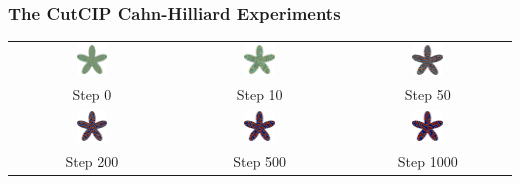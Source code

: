 \begin{frame}
\frametitle{The CutCIP Cahn-Hilliard Experiments}
\begin{center}
    \begin{tabular}{ccc}
        \includegraphics[width=0.2\textwidth]{CH-example/flower_0.png} &
        \includegraphics[width=0.2\textwidth]{CH-example/flower_10.png} &
        \includegraphics[width=0.2\textwidth]{CH-example/flower_50.png} \\
        Step 0 & Step 10 & Step 50 \\
        \includegraphics[width=0.2\textwidth]{CH-example/flower_200.png} &
        \includegraphics[width=0.2\textwidth]{CH-example/flower_500.png} &
        \includegraphics[width=0.2\textwidth]{CH-example/flower_1000.png} \\
        Step 200 & Step 500 & Step 1000 \\
    \end{tabular}
\end{center}
\end{frame}


